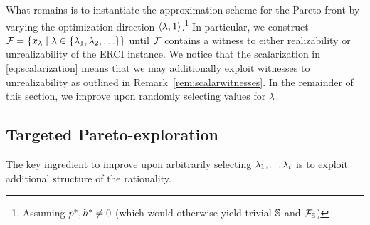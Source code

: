 {What remains is to instantiate the approximation scheme for the Pareto
front by varying the optimization direction
$\langle \lambda, 1\rangle$.\footnote{Assuming $p^{*}, h^{*} \neq 0$
  (which would otherwise yield trivial $\mathbb{S}$ and
  $\mathcal{F}_{\mathbb{S}}$)}  In particular, we construct
$\mathcal{F}_{} = \{ x_\lambda \mid \lambda \in \{ \lambda_1, \lambda_2, \hdots \} \}$
until $\mathcal{F}_{}$ contains a witness to either realizability or
unrealizability of the ERCI instance. We notice that the scalarization in \eqref{eq:scalarization} means that we may additionally exploit witnesses to unrealizability as outlined in Remark~\ref{rem:scalarwitnesses}. In the remainder of this
section, we improve upon randomly selecting values for $\lambda$.



%

\subsection{Targeted Pareto-exploration}
The key ingredient to improve upon arbitrarily selecting $\lambda_1, \hdots \lambda_i$ is to exploit additional structure of the rationality.  
%
%

}
